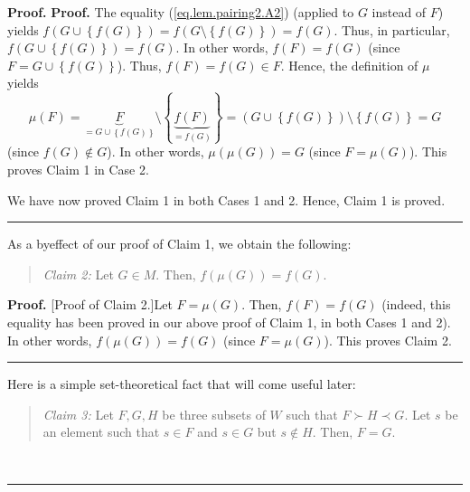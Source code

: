 \documentclass[numbers=enddot,12pt,final,onecolumn,notitlepage]{scrartcl}%
\theoremstyle{definition}
\newenvironment{statement}{\begin{quote}}{\end{quote}}
\newenvironment{proof}[1][Proof]{\noindent\textbf{#1.} }{\ \rule{0.5em}{0.5em}}
\newenvironment{verlong}{}{}
\newenvironment{vershort}{}{}
\begin{document}
\begin{proof}
\begin{proof}
\begin{verlong}
The equality (\ref{eq.lem.pairing2.A2}) (applied to $G$ instead of $F$) yields
$f\left(  G\cup\left\{  f\left(  G\right)  \right\}  \right)  =f\left(
G\setminus\left\{  f\left(  G\right)  \right\}  \right)  =f\left(  G\right)
$. Thus, in particular, $f\left(  G\cup\left\{  f\left(  G\right)  \right\}
\right)  =f\left(  G\right)  $. In other words, $f\left(  F\right)  =f\left(
G\right)  $ (since $F=G\cup\left\{  f\left(  G\right)  \right\}  $). Thus,
$f\left(  F\right)  =f\left(  G\right)  \in F$. Hence, the definition of $\mu$
yields
\[
\mu\left(  F\right)  =\underbrace{F}_{=G\cup\left\{  f\left(  G\right)
\right\}  }\setminus\left\{  \underbrace{f\left(  F\right)  }_{=f\left(
G\right)  }\right\}  =\left(  G\cup\left\{  f\left(  G\right)  \right\}
\right)  \setminus\left\{  f\left(  G\right)  \right\}  =G
\]
(since $f\left(  G\right)  \notin G$). In other words, $\mu\left(  \mu\left(
G\right)  \right)  =G$ (since $F=\mu\left(  G\right)  $). This proves Claim 1
in Case 2.
\end{verlong}

We have now proved Claim 1 in both Cases 1 and 2. Hence, Claim 1 is proved.
\end{proof}

As a byeffect of our proof of Claim 1, we obtain the following:

\begin{statement}
\textit{Claim 2:} Let $G\in M$. Then, $f\left(  \mu\left(  G\right)  \right)
=f\left(  G\right)  $.
\end{statement}

\begin{proof}
[Proof of Claim 2.]Let $F=\mu\left(  G\right)  $. Then, $f\left(  F\right)
=f\left(  G\right)  $ (indeed, this equality has been proved in our above
proof of Claim 1, in both Cases 1 and 2). In other words, $f\left(  \mu\left(
G\right)  \right)  =f\left(  G\right)  $ (since $F=\mu\left(  G\right)  $).
This proves Claim 2.
\end{proof}

Here is a simple set-theoretical fact that will come useful later:

\begin{statement}
\textit{Claim 3:} Let $F,G,H$ be three subsets of $W$ such that $F\succ H\prec
G$. Let $s$ be an element such that $s\in F$ and $s\in G$ but $s\notin H$.
Then, $F=G$.
\end{statement}

\begin{vershort}



\end{vershort}
\end{proof}
\end{document}
